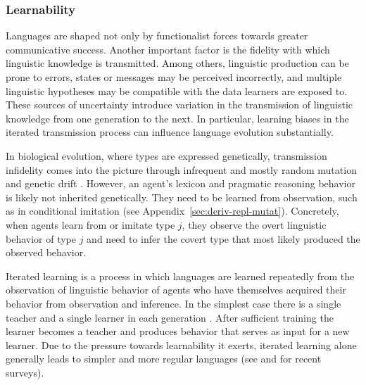 \documentclass[a4paper, 11pt]{article}
\theoremstyle{Satz}
\begin{document}
\subsubsection{Learnability}
\label{sec:learnability}
Languages are shaped not only by functionalist forces towards greater communicative success. Another
important factor is the fidelity with which linguistic knowledge is transmitted. Among others,
linguistic production can be prone to errors, states or messages may be perceived incorrectly,
and multiple linguistic hypotheses may be compatible with the data learners are exposed to. These sources
of uncertainty introduce variation in the transmission of linguistic knowledge from one
generation to the next. In particular, learning biases in the iterated transmission process can
influence language evolution substantially.

In biological evolution, where types are expressed genetically, transmission infidelity comes
into the picture through infrequent and mostly random mutation and genetic drift
\citep{kimura:1983}. However, an agent's lexicon and pragmatic reasoning behavior is likely not
inherited genetically. They need to be learned from observation, such as in conditional
imitation (see Appendix~\ref{sec:deriv-repl-mutat}).  Concretely, when agents learn from or
imitate type $j$, they observe the overt linguistic behavior of type $j$ and need to infer the
covert type that most likely produced the observed behavior.

Iterated learning is a process in which languages are learned repeatedly from the observation of linguistic behavior of agents who have themselves acquired their behavior from observation and inference. In the simplest case there is a single teacher and a single learner in each generation \citep[e.g.,][]{kirby:2001,brighton:2002}. After sufficient training the learner becomes a teacher and produces behavior that serves as input for a new learner. Due to the pressure towards learnability it exerts, iterated learning alone generally leads to simpler
and more regular languages (see \citealt{kirby+etal:2014} and \citealt{tamariz+kirby:2016} for
recent surveys).
\end{document}
